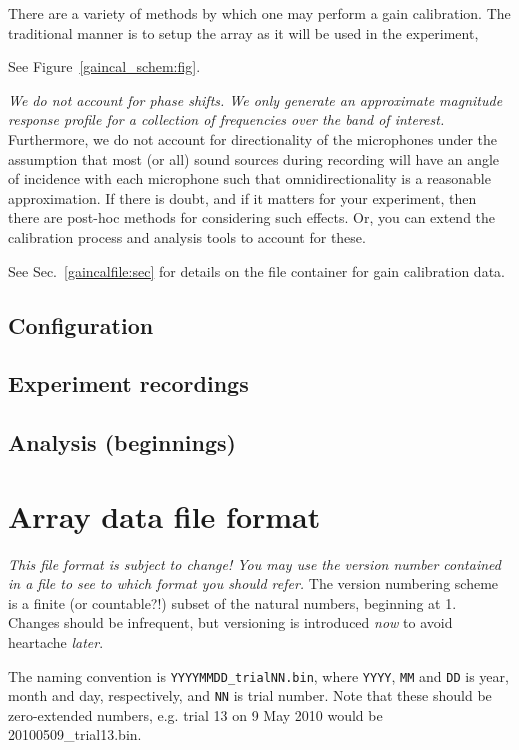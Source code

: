 \documentclass[letterpaper]{article}
\begin{document}
There are a variety of methods by which one may perform a gain
calibration. The traditional manner is to setup the array as it will be used in the experiment, 

See Figure~\ref{gaincal_schem:fig}.

\textit{We do not account for phase shifts. We only generate an
  approximate magnitude response profile for a collection of
  frequencies over the band of interest.} Furthermore, we do not
account for directionality of the microphones under the assumption
that most (or all) sound sources during recording will have an angle
of incidence with each microphone such that omnidirectionality is a
reasonable approximation. If there is doubt, and if it matters for
your experiment, then there are post-hoc methods for considering such
effects. Or, you can extend the calibration process and analysis tools
to account for these.

See Sec.~\ref{gaincalfile:sec} for details on the file container for
gain calibration data.


\subsection{Configuration}
\label{config:sec}



\subsection{Experiment recordings}


\subsection{Analysis (beginnings)}


\section{Array data file format}
\label{array_format:sec}

\textit{This file format is subject to change! You may use the version
  number contained in a file to see to which format you should refer.}
The version numbering scheme is a finite (or countable?!) subset of
the natural numbers, beginning at 1. Changes should be
infrequent, but versioning is introduced \textit{now} to avoid
heartache \textit{later}.

The naming convention is \texttt{YYYYMMDD\_trialNN.bin}, where
\texttt{YYYY}, \texttt{MM} and \texttt{DD} is year, month and day,
respectively, and \texttt{NN} is trial number. Note that these should
be zero-extended numbers, e.g. trial 13 on 9 May 2010 would be
20100509\_trial13.bin.
\end{document}
